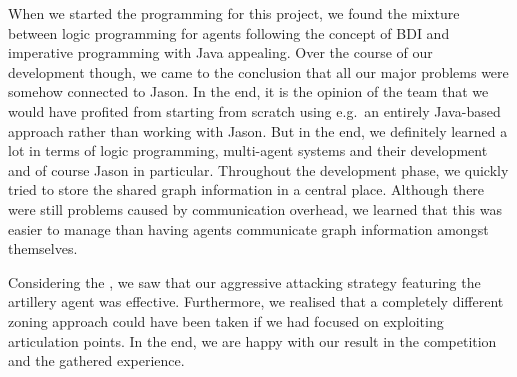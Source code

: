 When we started the programming for this project, we found the mixture between logic programming for agents following the concept of BDI and imperative programming with Java appealing.
Over the course of our development though, we came to the conclusion that all our major problems were somehow connected to Jason.
In the end, it is the opinion of the team that we  would have profited from starting from scratch using e.g.\ an entirely Java-based approach rather than working with Jason.
But in the end, we definitely learned a lot in terms of logic programming, multi-agent systems and their development and of course Jason in particular.
Throughout the development phase, we quickly tried to store the shared graph information in a central place.
Although there were still problems caused by communication overhead, we learned that this was easier to manage than having agents communicate graph information amongst themselves.

Considering the \mars{}, we saw that our aggressive attacking strategy featuring the artillery agent was effective.
Furthermore, we realised that a completely different zoning approach could have been taken if we had focused on exploiting articulation points.
In the end, we are happy with our result in the competition and the gathered experience.
